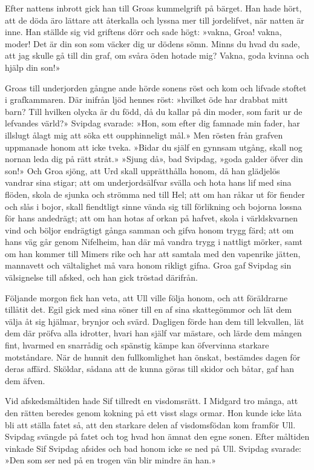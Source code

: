 Efter nattens inbrott gick han till Groas kummelgrift på bärget. Han
hade hört, att de döda äro lättare att återkalla och lyssna mer till
jordelifvet, när natten är inne. Han ställde sig vid griftens dörr och
sade högt: »vakna, Groa! vakna, moder! Det är din son som väcker dig ur
dödens sömn. Minns du hvad du sade, att jag skulle gå till din graf, om
svåra öden hotade mig? Vakna, goda kvinna och hjälp din son!»

Groas till underjorden gångne ande hörde sonens röst och kom och lifvade
stoftet i grafkammaren. Där inifrån ljöd hennes röst: »hvilket öde har
drabbat mitt barn? Till hvilken olycka är du född, då du kallar på din
moder, som farit ur de lefvandes värld?» Svipdag svarade: »Hon, som
efter dig famnade min fader, har illslugt ålagt mig att söka ett
oupphinneligt mål.» Men rösten från grafven uppmanade
honom att icke tveka. »Bidar du själf en gynnsam utgång, skall nog
nornan leda dig på rätt stråt.» »Sjung då», bad Svipdag, »goda galder
öfver din son!» Och Groa sjöng, att Urd skall upprätthålla honom, då han
glädjelös vandrar sina stigar; att om underjordsälfvar svälla och hota
hans lif med sina flöden, skola de sjunka och strömma ned till Hel; att
om han råkar ut för fiender och slås i bojor, skall fiendtligt sinne
vända sig till förlikning och bojorna lossna för hans andedrägt; att om
han hotas af orkan på hafvet, skola i världskvarnen vind och böljor
endrägtigt gånga samman och gifva honom trygg färd; att om hans väg går
genom Nifelheim, han där må vandra trygg i nattligt mörker, samt om han
kommer till Mimers rike och har att samtala med den vapenrike jätten,
mannavett och vältalighet må vara honom rikligt gifna. Groa gaf Svipdag
sin välsignelse till afsked, och han gick tröstad därifrån.

Följande morgon fick han veta, att Ull ville följa honom, och att
föräldrarne tillåtit det. Egil gick med sina söner till en af sina
skattegömmor och lät dem välja åt sig hjälmar, brynjor och svärd.
Dagligen förde han dem till lekvallen, lät dem där pröfva alla idrotter,
hvari han själf var mästare, och lärde dem mången fint, hvarmed en
snarrådig och spänstig kämpe kan öfvervinna starkare motståndare. När de
hunnit den fullkomlighet han önskat, bestämdes dagen för deras affärd.
Sköldar, sådana att de kunna göras till skidor och båtar, gaf han dem
äfven.

Vid afskedsmåltiden hade Sif tillredt en visdomsrätt. I Midgard tro
många, att den rätten beredes genom kokning på ett visst slags ormar.
Hon kunde icke låta bli att ställa fatet så, att den starkare delen af
visdomsfödan kom framför Ull. Svipdag svängde på fatet och tog hvad hon
ämnat den egne sonen. Efter måltiden vinkade Sif Svipdag afsides och bad
honom icke se ned på Ull. Svipdag svarade: »Den som ser ned på en trogen
vän blir mindre än han.»

